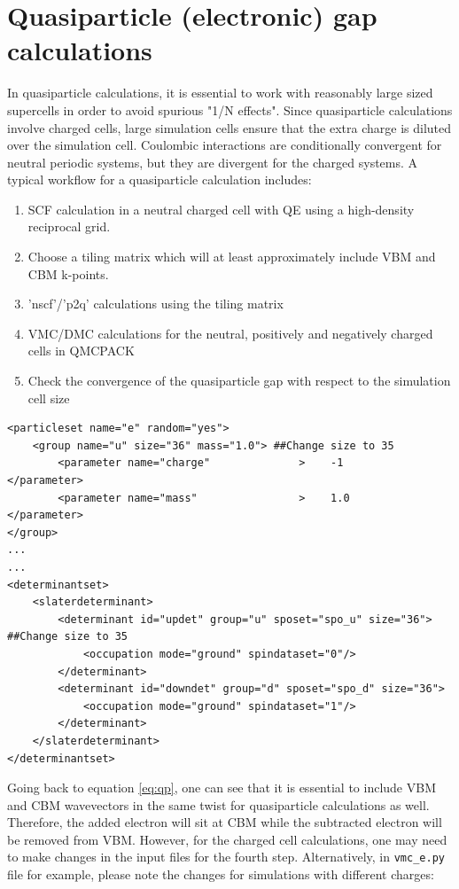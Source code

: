 \section{Quasiparticle (electronic) gap calculations}\label{sec:lab_ex_qp}
In quasiparticle calculations, it is essential to work with reasonably large sized supercells in order to avoid spurious "1/N effects". 
Since quasiparticle calculations involve charged cells, large simulation cells ensure that the extra charge is diluted over the simulation cell. Coulombic interactions are conditionally convergent for neutral periodic systems, but they are divergent for the charged systems. 
A typical workflow for a quasiparticle calculation includes:
\begin{enumerate}
	\item SCF calculation in a neutral charged cell with QE using a high-density reciprocal grid.
	\item Choose a tiling matrix which will at least approximately include VBM and CBM k-points. 
	\item 'nscf'/'p2q' calculations using the tiling matrix 
	\item VMC/DMC calculations for the neutral, positively and negatively charged cells in QMCPACK
	\item Check the convergence of the quasiparticle gap with respect to the simulation cell size
\end{enumerate}
\begin{lstlisting}
<particleset name="e" random="yes">
	<group name="u" size="36" mass="1.0"> ##Change size to 35
		<parameter name="charge"              >    -1                    </parameter>
		<parameter name="mass"                >    1.0                   </parameter>
</group>
...
...
<determinantset>
	<slaterdeterminant>
		<determinant id="updet" group="u" sposet="spo_u" size="36"> ##Change size to 35
		    <occupation mode="ground" spindataset="0"/>	
		</determinant>
		<determinant id="downdet" group="d" sposet="spo_d" size="36">
		    <occupation mode="ground" spindataset="1"/>	
		</determinant>
	</slaterdeterminant>
</determinantset>
\end{lstlisting}
Going back to equation \ref{eq:qp}, one can see that it is essential to include VBM and CBM wavevectors in the same twist for quasiparticle calculations as well. 
Therefore, the added electron will sit at CBM while the subtracted electron will be removed from VBM. 
However, for the charged cell calculations, one may need to make changes in the input files for the fourth step.  Alternatively, in \texttt{vmc\_\+e.py} file for example, please note the changes for simulations with different charges:

